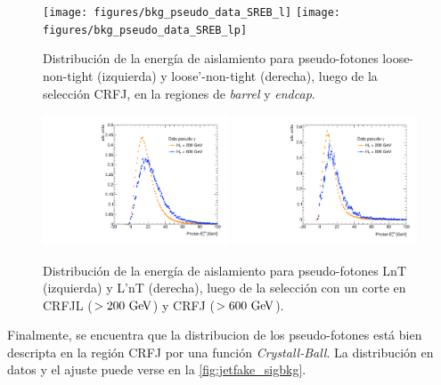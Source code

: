 \begin{figure}[!htbp]
  \centering

  \texttt{[image: figures/bkg\_pseudo\_data\_SREB\_l]}
  \texttt{[image: figures/bkg\_pseudo\_data\_SREB\_lp]}

  \caption{Distribución de la energía de aislamiento para pseudo-fotones loose-non-tight (izquierda) y loose'-non-tight (derecha),
    luego de la selección CRFJ, en la regiones de \emph{barrel} y \emph{endcap}.}
  \label{fig:jetfake_pseudo_data_BE}

\end{figure}

\begin{figure}[!htbp]
  \centering

  \includegraphics[width=0.49\textwidth]{figures/bkg_pseudo_data_SR_VR_l}
  \includegraphics[width=0.49\textwidth]{figures/bkg_pseudo_data_SR_VR_lp}

  \caption{Distribución de la energía de aislamiento para pseudo-fotones LnT (izquierda) y L'nT (derecha),
    luego de la selección con un corte en {\HT} CRFJL ($>200 \gev$) y CRFJ ($>600 \gev$).}
  \label{fig:jetfake_pseudo_data_LR_VR}

\end{figure}

Finalmente, se encuentra que la distribucion de los pseudo-fotones está bien
descripta en la región CRFJ por una función \emph{Crystall-Ball}. La
distribución en datos y el ajuste puede verse en la \cref{fig:jetfake_sigbkg}.


